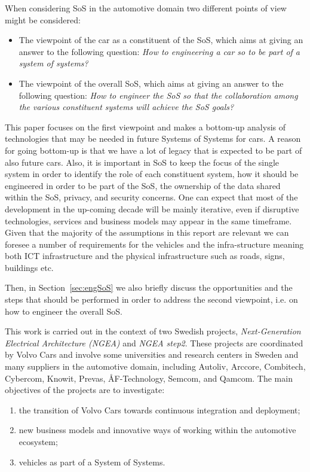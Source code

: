 When considering SoS in the automotive domain two different points of view might be considered: 

\begin{itemize}
\item The viewpoint of the car as a constituent of the SoS, which aims at giving an answer to the following question: {\em How to engineering a car so to be part of a system of systems?} %
\item The viewpoint of the overall SoS, which aims at giving an answer to the following question: {\em How to engineer the SoS so that the collaboration among the various constituent systems will achieve the SoS goals?}  
\end{itemize}

This paper focuses on the first viewpoint and makes a bottom-up analysis of technologies that may be needed in future Systems of Systems for cars. A reason for going bottom-up is that we have a lot of legacy that is expected to be part of also future cars.
Also, it is important in SoS to keep the focus of the single system in order to identify the role of each constituent system, how it should be engineered in order to be part of the SoS, the ownership of the data shared within the SoS, privacy, and security concerns. 
One can expect that most of the development in the up-coming decade  will be mainly iterative, even if disruptive technologies, services and business models may appear in the same timeframe. Given that the majority of the assumptions in this report are relevant we can foresee a number of requirements for the vehicles and the infra-structure meaning both ICT infrastructure and the physical infrastructure such as roads, signs, buildings etc. 

Then, in Section~\ref{sec:engSoS} we also briefly discuss the opportunities and the steps that should be performed in order to address the second viewpoint, i.e. on how to engineer the overall SoS. 

This work is carried out in the context of two Swedish projects, {\em Next-Generation Electrical Architecture (NGEA)} and {\em NGEA step2}. 
These projects are coordinated by Volvo Cars and involve some universities and research centers in Sweden and many suppliers in the automotive domain, including Autoliv, Arccore, Combitech, Cybercom, Knowit, Prevas, \AA F-Technology, Semcom, and Qamcom. %
The main objectives of the projects are to investigate:
	\begin{enumerate} %
		\item the transition of Volvo Cars towards continuous integration and deployment;
		\item new business models and innovative ways of working within the automotive ecosystem; 
		\item vehicles as part of a System of Systems.
	\end{enumerate}


